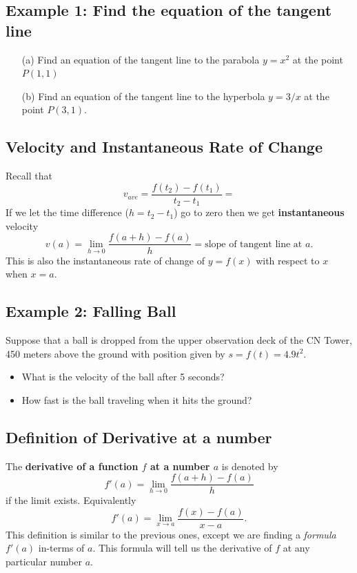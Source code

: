\documentclass[10pt]{book}
\theoremstyle{definition}
\begin{document}
\subsection*{Example 1: Find the equation of the tangent line}
\begin{itemize}
    \item[(a)] Find an equation of the tangent line to the parabola $y=x^2$ at the point $P(1,1)$\vspace{5cm}
    \item[(b)] Find an equation of the tangent line to the hyperbola $y=3/x$ at the point $P(3,1)$.
\end{itemize}
\raggedbottom
\clearpage
\begin{tcolorbox}
\subsection*{Velocity and Instantaneous Rate of Change}
Recall that 
\[
v_{ave}=\frac{f(t_2)-f(t_1)}{t_2-t_1}=
\]
If we let the time difference ($h=t_2-t_1$) go to zero then we get \textbf{instantaneous} velocity
\[
v(a)=\lim_{h\rightarrow 0}\frac{f(a+h)-f(a)}{h}=\textrm{slope of tangent line at $a$.}
\]
This is also the instantaneous rate of change of $y=f(x)$ with respect to $x$ when $x=a$.
\end{tcolorbox}
\subsection*{Example 2: Falling Ball}
Suppose that a ball is dropped from the upper observation deck of the CN Tower, 450 meters above the ground with position given by $s=f(t)=4.9t^2$.
\begin{itemize}
    \item What is the velocity of the ball after 5 seconds?
    \item How fast is the ball traveling when it hits the ground?
\end{itemize}
\vspace{8cm}
\begin{tcolorbox}
\subsection*{Definition of Derivative at a number}
The \textbf{derivative of a function $f$ at a number $a$} is denoted by
\[
f'(a)=\lim_{h\rightarrow 0}\frac{f(a+h)-f(a)}{h}
\]
if the limit exists. Equivalently
\[
f'(a)=\lim_{x\rightarrow a}\frac{f(x)-f(a)}{x-a}.
\]
This definition is similar to the previous ones, except we are finding a \textit{formula} $f'(a)$ in-terms of $a$. This formula will tell us the derivative of $f$ at any particular number $a$. 
\end{tcolorbox}
\raggedbottom
\clearpage
\end{document}

